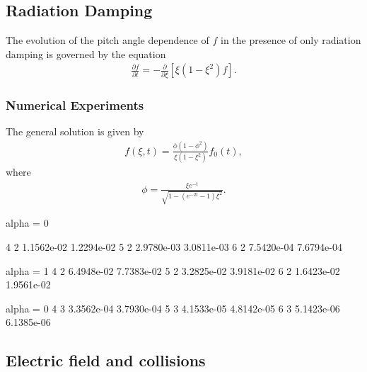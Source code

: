 \documentclass[final,leqno]{siamltex704}
\begin{document}
\subsection{Radiation Damping}
The evolution of the pitch angle dependence of $f$ in the presence of only radiation damping is governed by the equation
\begin{eqnarray}
\frac{\partial f}{\partial t} = -\frac{\partial}{\partial\xi}[\xi(1-\xi^2)f].
\end{eqnarray}

\subsubsection{Numerical Experiments}
The general solution is given by
\begin{eqnarray}
f(\xi,t)=\frac{\phi(1-\phi^2)}{\xi(1-\xi^2)}f_0(t),
\end{eqnarray}
where
\begin{eqnarray*}
\phi=\frac{\xi e^{-t}}{\sqrt{1-(e^{-2t}-1)\xi^2}}.
\end{eqnarray*}

alpha = 0

4 2 1.1562e-02   1.2294e-02
5 2 2.9780e-03   3.0811e-03
6 2 7.5420e-04   7.6794e-04

alpha = 1
4 2 6.4948e-02   7.7383e-02
5 2 3.2825e-02   3.9181e-02
6 2 1.6423e-02   1.9561e-02

alpha = 0
4 3 3.3562e-04   3.7930e-04
5 3 4.1533e-05   4.8142e-05
6 3 5.1423e-06   6.1385e-06



\subsection{Electric field and collisions}
\end{document}

